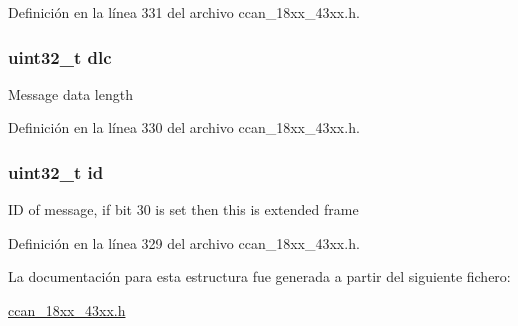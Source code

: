 Definición en la línea 331 del archivo ccan\+\_\+18xx\+\_\+43xx.\+h.

\subsubsection[{\texorpdfstring{dlc}{dlc}}]{\setlength{\rightskip}{0pt plus 5cm}uint32\+\_\+t dlc}\hypertarget{struct_c_c_a_n___m_s_g___o_b_j___t_a811fbb0cb2c2263b1a7440a7e9d78239}{}\label{struct_c_c_a_n___m_s_g___o_b_j___t_a811fbb0cb2c2263b1a7440a7e9d78239}
Message data length 

Definición en la línea 330 del archivo ccan\+\_\+18xx\+\_\+43xx.\+h.

\subsubsection[{\texorpdfstring{id}{id}}]{\setlength{\rightskip}{0pt plus 5cm}uint32\+\_\+t id}\hypertarget{struct_c_c_a_n___m_s_g___o_b_j___t_abaabdc509cdaba7df9f56c6c76f3ae19}{}\label{struct_c_c_a_n___m_s_g___o_b_j___t_abaabdc509cdaba7df9f56c6c76f3ae19}
ID of message, if bit 30 is set then this is extended frame 

Definición en la línea 329 del archivo ccan\+\_\+18xx\+\_\+43xx.\+h.



La documentación para esta estructura fue generada a partir del siguiente fichero\+:\begin{DoxyCompactItemize}
\item 
\hyperlink{ccan__18xx__43xx_8h}{ccan\+\_\+18xx\+\_\+43xx.\+h}\end{DoxyCompactItemize}
